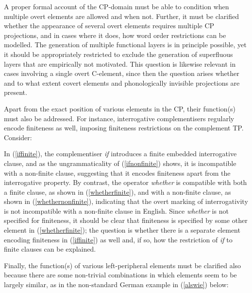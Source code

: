 A proper formal account of the CP-domain must be able to condition when multiple overt elements are allowed and when not. Further, it must be clarified whether the appearance of several overt elements requires multiple CP projections, and in cases where it does, how word order restrictions can be modelled. The generation of multiple functional layers is in principle possible, yet it should be appropriately restricted to exclude the generation of superfluous layers that are empirically not motivated. This question is likewise relevant in cases involving a single overt C-element, since then the question arises whether and to what extent covert elements and phonologically invisible projections are present.

Apart from the exact position of various elements in the CP, their function(s) must also be addressed. For instance, interrogative complementisers regularly encode finiteness as well, imposing finiteness restrictions on the complement TP. Consider:

\ea \label{ifwhether}
\z
\z

\begin{sloppypar}
In (\ref{iffinite}), the complementiser \textit{if} introduces a finite embedded interrogative clause, and as the ungrammaticality of (\ref{ifnonfinite}) shows, it is incompatible with a non-finite clause, suggesting that it encodes finiteness apart from the interrogative property. By contrast, the operator \textit{whether} is compatible with both a finite clause, as shown in (\ref{whetherfinite}), and with a non-finite clause, as shown in (\ref{whethernonfinite}), indicating that the overt marking of interrogativity is not incompatible with a non-finite clause in English. Since \textit{whether} is not specified for finiteness, it should be clear that finiteness is specified by some other element in (\ref{whetherfinite}); the question is whether there is a separate element encoding finiteness in (\ref{iffinite}) as well and, if so, how the restriction of \textit{if} to finite clauses can be explained.
\end{sloppypar}

Finally, the function(s) of various left-peripheral elements must be clarified also because there are some non-trivial combinations in which elements seem to be largely similar, as in the non-standard German example in (\ref{alswie}) below:

